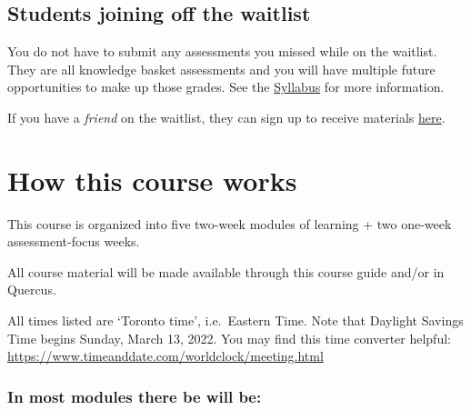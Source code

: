 \documentclass[
  openany]{book}
\begin{document}
\hypertarget{students-joining-off-the-waitlist}{%
\subsection{Students joining off the waitlist}\label{students-joining-off-the-waitlist}}

You do not have to submit any assessments you missed while on the waitlist. They are all knowledge basket assessments and you will have multiple future opportunities to make up those grades. See the \protect\hyperlink{syllabus}{Syllabus} for more information.

If you have a \emph{friend} on the waitlist, they can sign up to receive materials \href{https://forms.office.com/r/sKWPFFE2Cd}{here}.

\hypertarget{howthiscourseworks}{%
\section{How this course works}\label{howthiscourseworks}}

This course is organized into five two-week modules of learning + two one-week assessment-focus weeks.

All course material will be made available through this course guide and/or in Quercus.

All times listed are `Toronto time', i.e.~Eastern Time. Note that Daylight Savings Time begins Sunday, March 13, 2022. You may find this time converter helpful: \url{https://www.timeanddate.com/worldclock/meeting.html}

\hypertarget{in-most-modules-there-be-will-be}{%
\subsubsection{\texorpdfstring{\textbf{In most modules there be will be:}}{In most modules there be will be:}}\label{in-most-modules-there-be-will-be}}
\end{document}
